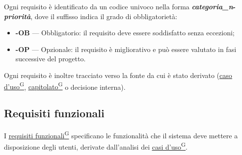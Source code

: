 ﻿\documentclass[a4paper,12pt]{article}
\providecommand{\glslink}[2]{\href{https://alittlebyte-19.github.io/Documentazione/glossario.html\#gls-#1}{\underline{#2}\textsuperscript{\scriptsize G}}}
\begin{document}
Ogni requisito è identificato da un codice univoco nella forma \textbf{\textit{categoria\_n}-\textit{priorità}}, dove il suffisso indica il grado di obbligatorietà:
\begin{itemize}
    \item \textbf{-OB} — Obbligatorio: il requisito deve essere soddisfatto senza eccezioni;
    \item \textbf{-OP} — Opzionale: il requisito è migliorativo e può essere valutato in fasi successive del progetto.
\end{itemize}

Ogni requisito è inoltre tracciato verso la fonte da cui è stato derivato (\glslink{caso-d-uso-uc}{caso d'uso}, \glslink{capitolato}{capitolato} o decisione interna).

\subsection{Requisiti funzionali}

I \glslink{requisiti-funzionali}{requisiti funzionali} specificano le funzionalità che il sistema deve mettere a disposizione degli utenti, derivate dall'analisi dei \glslink{caso-d-uso-uc}{casi d'uso}.
\end{document}

